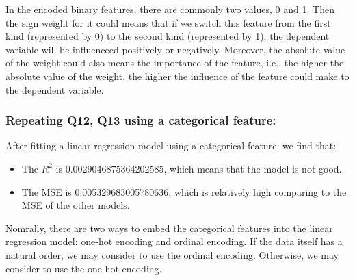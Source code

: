 \documentclass{article}
\begin{document}
In the encoded binary features, there are commonly two values, 0 and 1. 
Then the sign weight for it could means that if we switch this feature from the first kind (represented by 0) to the second kind (represented by 1), the dependent variable will be influenceed positively or negatively.
Moreover, the absolute value of the weight could also means the importance of the feature, i.e., the higher the absolute value of the weight, the higher the influence of the feature could make to the dependent variable.

\subsubsection*{Repeating Q12, Q13 using a categorical feature:}

After fitting a linear regression model using a categorical feature, we find that:

\begin{itemize}
    \item The $R^2$ is 0.0029046875364202585, which means that the model is not good.
    \item The MSE is 0.005329683005780636, which is relatively high comparing to the MSE of the other models.
\end{itemize}

Nomrally, there are two ways to embed the categorical features into the linear regression model: one-hot encoding and ordinal encoding. If the data itself has a natural order, we may consider to use the ordinal encoding. Otherwise, we may consider to use the one-hot encoding. 
\end{document}
